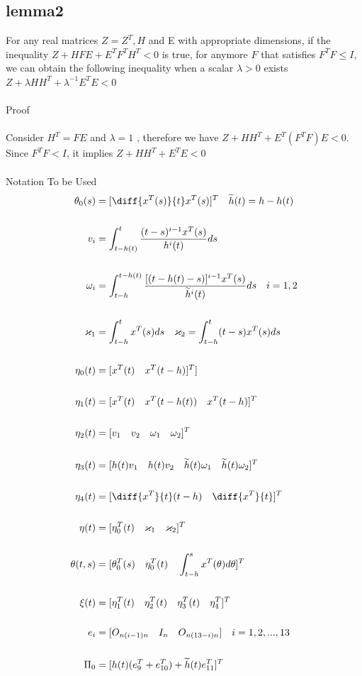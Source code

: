 \documentclass[journal]{IEEEtran}
\begin{document}
 \subsection{lemma2}
 For any real matrices $Z=Z^T, H$ and E with appropriate dimensions, if the inequality $Z +HFE+E^TF^TH^T<0$ is true, for anymore
 $F$ that satisfies $F^TF\leq I$, we can obtain the following inequality when a scalar $\lambda > 0$ exists $Z+\lambda HH^T +\lambda ^{-1}E^TE<0$ \\ \\
 Proof \\ \\
 Consider $H^T=FE$ and $\lambda =1$ , therefore we have 
   $Z+HH^T+E^T(F^TF)E<0$.
Since $F^TF< I$, it implies 
$Z+HH^T +E^TE<0$ \\ \\
 Notation To be Used \\ 
 \begin{align}
   \theta _0(s) &= [\diff{x^T(s)}{t} x^T(s)]^T \quad  \widetilde{h}(t) = h-h(t) \\ \\
   v_i &= \int ^t _{t-h(t)} \frac{(t-s)^{i-1}x^T(s)}{h^i(t)}ds \\ \\
   \omega _i &= \int ^{t-h(t)} _{t-h} \frac{[(t-h(t)-s)]^{i-1}x^T(s)}{\widetilde{h}^i(t)}ds \quad  i= 1,2 \\ \\
   \varkappa _1 &= \int ^t _{t-h} x^T(s)ds \quad \varkappa _2 =\int ^t _{t-h} (t-s)x^T(s)ds \\ \\
   \eta _0(t) &= [x^T(t)\quad x^T(t-h)]^T] \\ \\
   \eta _1(t) &= [x^T(t)\quad x^T(t-h(t)) \quad x^T(t-h)]^T \\ \\ 
   \eta _2(t) &= [v_1 \quad v_2 \quad \omega _1 \quad \omega _2]^T \\ \\
   \eta _3(t) &= [h(t)v_1 \quad h(t)v_2 \quad \widetilde{h}(t)\omega _1 \quad \widetilde{h}(t)\omega _2]^T \\ \\
   \eta _4(t) &= [\diff{x^T}{t}(t-h)  \quad \diff{x^T}{t}]^T \\ \\
   \eta (t) &=[\eta _0^T(t) \quad \varkappa _1 \quad \varkappa _2]^T  \\ \\
   \theta(t,s)&=[\theta _0^T(s) \quad \eta _0 ^T(t) \quad \int _{t-h}^s x^T(\theta)d\theta]^T \\ \\
   \xi (t) &= [\eta _1^T(t) \quad \eta _2^T(t) \quad  \eta _3^T(t) \quad \eta _4^T]^T   \\ \\
   e_i &= [O_{n(i-1)n}\quad I_n \quad O_{n(13-i)n}] \quad i=1,2,...,13 \\ \\ 
   \Pi_0&=[h(t)(e_9^T +e_{10}^T) +\widetilde{h}(t)e^T_{11} ]^T 
 \end{align}
\end{document}

